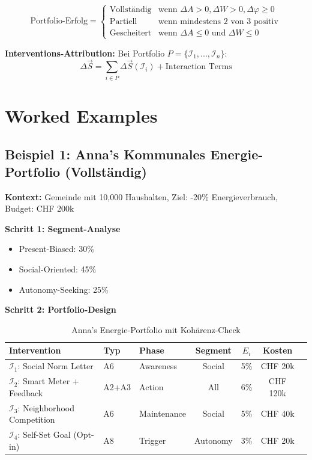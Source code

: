 \begin{equation}
\text{Portfolio-Erfolg} = \begin{cases}
\text{Vollständig} & \text{wenn } \Delta A > 0, \Delta W > 0, \Delta\varphi \geq 0 \\
\text{Partiell} & \text{wenn mindestens 2 von 3 positiv} \\
\text{Gescheitert} & \text{wenn } \Delta A \leq 0 \text{ und } \Delta W \leq 0
\end{cases}
\end{equation}

\textbf{Interventions-Attribution:} Bei Portfolio $P = \{\mathcal{I}_1, ..., \mathcal{I}_n\}$:
\begin{equation}
\Delta\vec{S} = \sum_{i \in P} \Delta\vec{S}(\mathcal{I}_i) + \text{Interaction Terms}
\end{equation}


\section{Worked Examples}
\label{sec:20-examples}

\subsection{Beispiel 1: Anna's Kommunales Energie-Portfolio (Vollständig)}

\textbf{Kontext:} Gemeinde mit 10,000 Haushalten, Ziel: -20\% Energieverbrauch, Budget: CHF 200k

\textbf{Schritt 1: Segment-Analyse}
\begin{itemize}[nosep]
\item Present-Biased: 30\%
\item Social-Oriented: 45\%
\item Autonomy-Seeking: 25\%
\end{itemize}

\textbf{Schritt 2: Portfolio-Design}

\begin{table}[htbp]
\centering
\caption{Anna's Energie-Portfolio mit Kohärenz-Check}
\label{tab:20-example-anna}
\renewcommand{\arraystretch}{1.3}
\small
\begin{tabular}{@{}lllcccc@{}}
\toprule
\textbf{Intervention} & \textbf{Typ} & \textbf{Phase} & \textbf{Segment} & \textbf{$E_i$} & \textbf{Kosten} \\
\midrule
$\mathcal{I}_1$: Social Norm Letter & A6 & Awareness & Social & 5\% & CHF 20k \\
$\mathcal{I}_2$: Smart Meter + Feedback & A2+A3 & Action & All & 6\% & CHF 120k \\
$\mathcal{I}_3$: Neighborhood Competition & A6 & Maintenance & Social & 5\% & CHF 40k \\
$\mathcal{I}_4$: Self-Set Goal (Opt-in) & A8 & Trigger & Autonomy & 3\% & CHF 20k \\
\bottomrule
\end{tabular}
\end{table}

